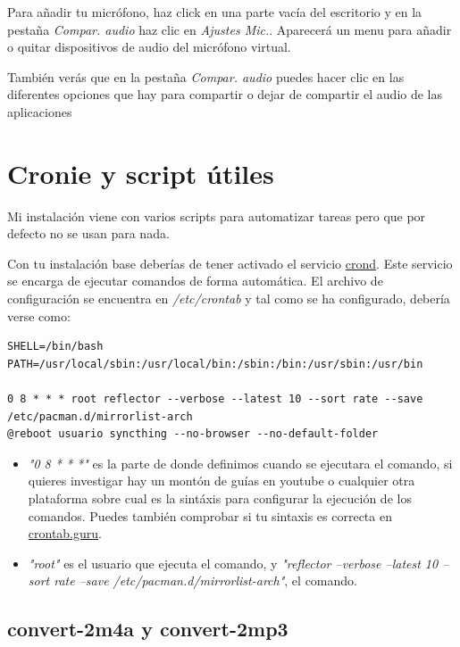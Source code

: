 \documentclass[12pt]{article}
\begin{document}
Para añadir tu micrófono, haz click en una parte vacía del escritorio y en la pestaña \emph{Compar. audio} haz clic en \emph{Ajustes Mic.}. Aparecerá un menu para añadir o quitar dispositivos de audio del micrófono virtual.

También verás que en la pestaña \emph{Compar. audio} puedes hacer clic en las diferentes opciones que hay para compartir o dejar de compartir el audio de las aplicaciones

\section{Cronie y script útiles}

Mi instalación viene con varios scripts para automatizar tareas pero que por defecto no se usan para nada.

Con tu instalación base deberías de tener activado el servicio \href{https://wiki.archlinux.org/title/cron}{crond}. Este servicio se encarga de ejecutar comandos de forma automática. El archivo de configuración se encuentra en \emph{/etc/crontab} y tal como se ha configurado, debería verse como:


\begin{lstlisting}[basicstyle=\scriptsize\ttfamily]
SHELL=/bin/bash
PATH=/usr/local/sbin:/usr/local/bin:/sbin:/bin:/usr/sbin:/usr/bin

0 8 * * * root reflector --verbose --latest 10 --sort rate --save /etc/pacman.d/mirrorlist-arch
@reboot usuario syncthing --no-browser --no-default-folder
\end{lstlisting}

\begin{itemize}
\setlength\itemsep{-0.2em}
\item \emph{"0 8 * * *"} es la parte de donde definimos cuando se ejecutara el comando, si quieres investigar hay un montón de guías en youtube o cualquier otra plataforma sobre cual es la sintáxis para configurar la ejecución de los comandos. Puedes también comprobar si tu sintaxis es correcta en \href{https://crontab.guru/}{crontab.guru}.
\item \emph{"root"} es el usuario que ejecuta el comando, y \emph{"reflector --verbose --latest 10 --sort rate --save /etc/pacman.d/mirrorlist-arch"}, el comando.
\end{itemize}

\subsection{convert-2m4a y convert-2mp3}
\end{document}
